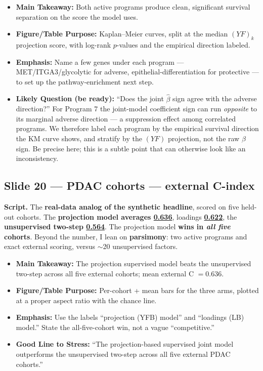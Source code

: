 \documentclass[11pt]{article}
\newcommand{\scriptlabel}{\textbf{Script. }}
\newcommand{\sectionlabel}[1]{\textbf{#1}}
\newcommand{\key}[1]{\textcolor{keyblue}{\textbf{#1}}}        %
\newcommand{\num}[1]{\textcolor{keycar}{\textbf{\uline{#1}}}} %
\begin{document}
\begin{itemize}
\item \sectionlabel{Main Takeaway:} Both active programs produce clean, significant survival
separation on the score the model uses.
\item \sectionlabel{Figure/Table Purpose:} Kaplan--Meier curves, split at the median $(YF)_k$
projection score, with log-rank $p$-values and the empirical direction labeled.
\item \sectionlabel{Emphasis:} Name a few genes under each program --- MET/ITGA3/glycolytic for
adverse, epithelial-differentiation for protective --- to set up the pathway-enrichment next step.
\item \sectionlabel{Likely Question (be ready):} ``Does the joint $\hat\beta$ sign agree with the
adverse direction?'' For Program 7 the joint-model coefficient sign can run \emph{opposite} to its
marginal adverse direction --- a suppression effect among correlated programs. We therefore label
each program by the empirical survival direction the KM curve shows, and stratify by the $(YF)$
projection, not the raw $\beta$ sign. Be precise here; this is a subtle point that can otherwise look
like an inconsistency.
\end{itemize}

\subsection*{Slide 20 --- PDAC cohorts --- external C-index}
\scriptlabel The \key{real-data analog of the synthetic headline}, scored on five held-out cohorts.
The \key{projection model averages \num{0.636}}, loadings \num{0.622}, the \key{unsupervised
two-step \num{0.564}}. The projection model \key{wins in \emph{all five} cohorts}. Beyond the number,
I lean on \key{parsimony}: two active programs and exact external scoring, versus $\sim$20
unsupervised factors.

\begin{itemize}
\item \sectionlabel{Main Takeaway:} The projection supervised model beats the unsupervised two-step
across all five external cohorts; mean external C $= 0.636$.
\item \sectionlabel{Figure/Table Purpose:} Per-cohort + mean bars for the three arms, plotted at a
proper aspect ratio with the chance line.
\item \sectionlabel{Emphasis:} Use the labels ``projection (YFB) model'' and ``loadings (LB)
model.'' State the all-five-cohort win, not a vague ``competitive.''
\item \sectionlabel{Good Line to Stress:} ``The projection-based supervised joint model outperforms
the unsupervised two-step across all five external PDAC cohorts.''
\end{itemize}
\end{document}
